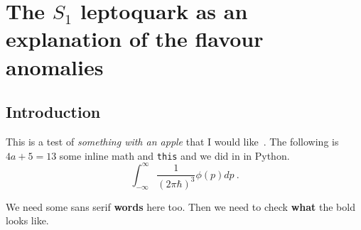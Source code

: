 \graphicspath{{img/chapter_4/}}

\chapter{The $S_{1}$ leptoquark as an explanation of the flavour anomalies}
\label{chapter:the-one-lq}

\section{Introduction}

This is a test of \textit{something with an apple} that I would like~\cite{Weinberg:1967tq}.
The following is $4a + 5 = 13$ some inline math and \texttt{this} and we did in in \textsf{Python}.
\begin{equation}
  \label{eq:1}
  \int_{-\infty}^{\infty} \frac{1}{(2\pi \hbar)^{3}} \phi(p) dp \ .
\end{equation}

\textsf{We need some sans serif \textbf{words} here too.} Then we need to check
\textbf{what} the bold looks like.

